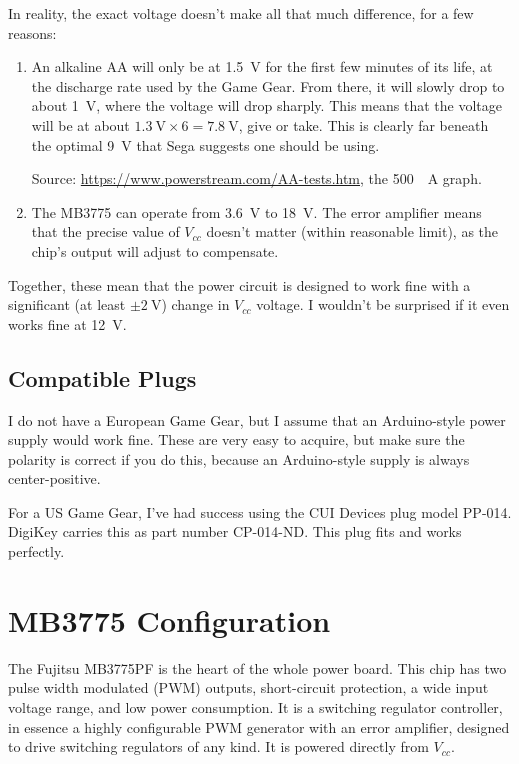 \documentclass{article}
\newcommand{\Vcc}{$V_{cc}$}
\newcommand{\model}{\textsf}
\begin{document}
In reality, the exact voltage doesn't make all that much difference,
for a few reasons:

\begin{enumerate}
\item An alkaline AA will only be at \qty{1.5}{\volt} for the first
  few minutes of its life, at the discharge rate used by the Game
  Gear. From there, it will slowly drop to about \qty{1}{\volt}, where
  the voltage will drop sharply. This means that the voltage will be
  at about $\qty{1.3}{\volt} \times{} 6 = \qty{7.8}{\volt}$, give or
  take. This is clearly far beneath the optimal \qty{9}{\volt} that
  Sega suggests one should be using.

  Source: \url{https://www.powerstream.com/AA-tests.htm}, the
  \qty{500}{\milli{}A} graph.
\item The \model{MB3775} can operate from \qty{3.6}{\volt} to
  \qty{18}{\volt}. The error amplifier means that the precise value of
  \Vcc{} doesn't matter (within reasonable limit), as the chip's
  output will adjust to compensate.
\end{enumerate}

Together, these mean that the power circuit is designed to work fine
with a significant (at least $\pm{}\qty{2}{\volt}$) change in \Vcc{}
voltage. I wouldn't be surprised if it even works fine at
\qty{12}{\volt}.

\subsection{Compatible Plugs}
I do not have a European Game Gear, but I assume that an Arduino-style
power supply would work fine. These are very easy to acquire, but make
sure the polarity is correct if you do this, because an Arduino-style
supply is always center-positive.

For a US Game Gear, I've had success using the CUI Devices plug model
\model{PP-014}. DigiKey carries this as part number
\model{CP-014-ND}. This plug fits and works perfectly.

\section{\model{MB3775} Configuration}
The Fujitsu \model{MB3775PF} is the heart of the whole power
board. This chip has two pulse width modulated (PWM) outputs,
short-circuit protection, a wide input voltage range, and low power
consumption. It is a switching regulator controller, in essence a
highly configurable PWM generator with an error amplifier, designed to
drive switching regulators of any kind. It is powered directly from
\Vcc{}.
\end{document}
